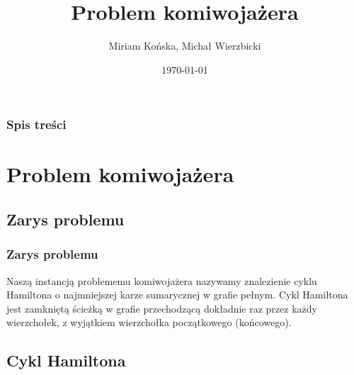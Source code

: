 \documentclass{beamer}
\title[TSP ACO]{Problem komiwojażera} %
\author{Miriam Końska, Michał Wierzbicki} %
\institute[IIUWr] %
{
University of Wrocław \\ %
\medskip
}
\date{\today} %
\begin{document}
\begin{frame}
\titlepage %
\end{frame}

\begin{frame}
\frametitle{Spis treści} %
\tableofcontents %
\end{frame}


\section{Problem komiwojażera} %

\subsection{Zarys problemu} %


\begin{frame}
\frametitle{Zarys problemu}
Naszą instancją problememu komiwojażera nazywamy znalezienie cyklu Hamiltona o najmniejszej karze sumarycznej w grafie pełnym.
Cykl Hamiltona jest zamkniętą ścieżką w grafie przechodzącą dokładnie raz przez każdy wierzchołek, z wyjątkiem wierzchołka początkowego (końcowego).

\end{frame}


\subsection{Cykl Hamiltona}
\end{document}
